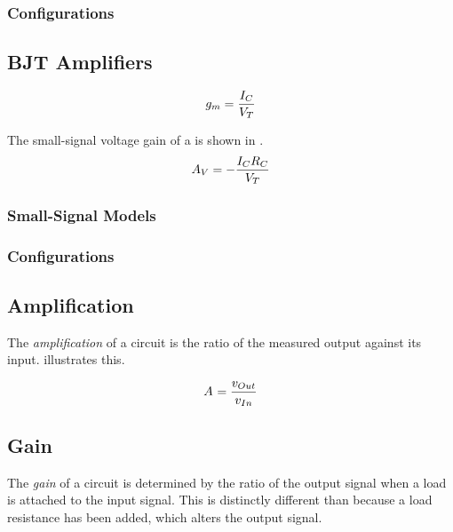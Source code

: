 \subsubsection{Configurations}\label{subsubsec:MOSFET_Configurations}

\subsection{BJT Amplifiers}\label{subsec:BJT_Amps}
\begin{equation}\label{eq:BJT-Transconductance_Gain}
  \TransconductanceGain = \frac{\DCCurrent{\Collector}}{\ThermalVoltage}
\end{equation}

The small-signal voltage gain of a  is shown in .
\begin{equation}\label{eq:BJT-Small_Signal_Voltage_Gain}
  \Amp{V} = - \frac{\DCCurrent{\Collector} R_{\Collector}}{\ThermalVoltage}
\end{equation}

\subsubsection{Small-Signal Models}\label{subsubsec:BJT-Small_Signal_Models}

\subsubsection{Configurations}\label{subsubsec:BJT_Configurations}

\subsection{Amplification}\label{subsec:Amplification}
The \emph{amplification} of a circuit is the ratio of the measured output against its input.
 illustrates this.

\begin{equation}\label{eq:Amplification}
  \Amp{} = \frac{\ACVoltage{\Out}}{\ACVoltage{\In}}
\end{equation}

\subsection{Gain}\label{subsec:Gain}
The \emph{gain} of a circuit is determined by the ratio of the output signal when a load is attached to the input signal.
This is distinctly different than  because a load resistance has been added, which alters the output signal.

